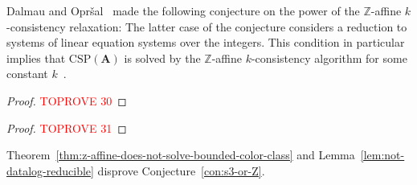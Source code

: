 \documentclass[a4paper,english, thm-restate]{lipics-v2021}
\newcommand{\ZZ}{\mathbb{Z}}
\newcommand{\StructA}{\mathbf{A}}
\newcommand{\CSP}[1]{\mathrm{CSP}(#1)}
\begin{document}
	
	\noindent Dalmau and Opr\v{s}al~\cite{DalmauOprsal2024} made the following
	conjecture on the power of the $\ZZ$-affine $k$-consistency relaxation:
	\sthreeorZ*
	\noindent The latter case of the conjecture considers a reduction to systems of linear equation systems over the integers.
	This condition in particular implies
	that $\CSP{\StructA}$ is solved by the  $\ZZ$-affine $k$-consistency algorithm for some constant $k$~\cite{DalmauOprsal2024}.
	
	
	
	
	\zAffineDoesNotSolveBoundedColorClass*
	\begin{proof}\textcolor{red}{TOPROVE 30}\end{proof}
	
	\notDatalogReducible*
	\begin{proof}\textcolor{red}{TOPROVE 31}\end{proof}
	
	\noindent
	Theorem~\ref{thm:z-affine-does-not-solve-bounded-color-class}
	and Lemma~\ref{lem:not-datalog-reducible}
	disprove Conjecture~\ref{con:s3-or-Z}.
	
\end{document}
